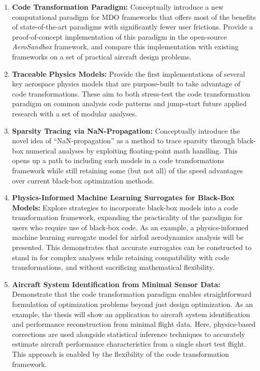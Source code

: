 \begin{enumerate}
    \item \textbf{Code Transformation Paradigm:} Conceptually introduce a new computational paradigm for MDO frameworks that offers most of the benefits of state-of-the-art paradigms with significantly fewer user frictions. Provide a proof-of-concept implementation of this paradigm in the open-source \textit{AeroSandbox} \cite{sharpe_aerosandbox_2021} framework, and compare this implementation with existing frameworks on a set of practical aircraft design problems.
    \item \textbf{Traceable Physics Models:} Provide the first implementations of several key aerospace physics models that are purpose-built to take advantage of code transformations. These aim to both stress-test the code transformation paradigm on common analysis code patterns and jump-start future applied research with a set of modular analyses.
    \item \textbf{Sparsity Tracing via NaN-Propagation:} Conceptually introduce the novel idea of ``NaN-propagation'' as a method to trace sparsity through black-box numerical analyses by exploiting floating-point math handling. This opens up a path to including such models in a code transformations framework while still retaining some (but not all) of the speed advantages over current black-box optimization methods.
    \item \textbf{Physics-Informed Machine Learning Surrogates for Black-Box Models:} Explore strategies to incorporate black-box models into a code transformation framework, expanding the practicality of the paradigm for users who require use of black-box code. As an example, a physics-informed machine learning surrogate model for airfoil aerodynamics analysis will be presented. This demonstrates that accurate surrogates can be constructed to stand in for complex analyses while retaining compatibility with code transformations, and without sacrificing mathematical flexibility.
    \item \textbf{Aircraft System Identification from Minimal Sensor Data:} Demonstrate that the code transformation paradigm enables straightforward formulation of optimization problems beyond just design optimization. As an example, the thesis will show an application to aircraft system identification and performance reconstruction from minimal flight data. Here, physics-based corrections are used alongside statistical inference techniques to accurately estimate aircraft performance characteristics from a single short test flight. This approach is enabled by the flexibility of the code transformation framework.

\end{enumerate}
